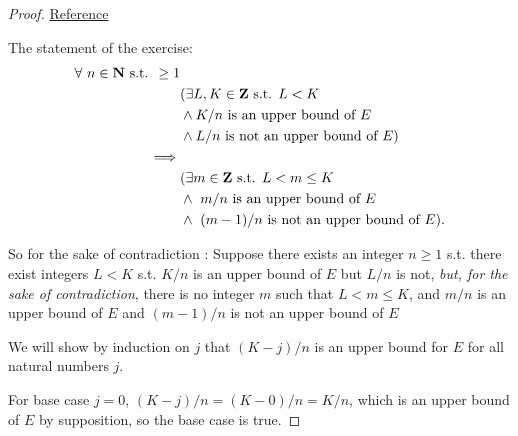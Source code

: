\begin{proof}
\href{https://taoanalysis.wordpress.com/2020/05/14/exercise-5-5-2/}{Reference}

The statement of the exercise:
\begin{align*}
    \forall\ n \in \mathbf{N} \text{ s.t. } \ge 1 & \\
             & (\exists L, K \in \mathbf{Z} \text{ s.t. } L < K \\
             &  \land K/n \text{ is an upper bound of } E \\
             &  \land L/n \text{ is not an upper bound of } E) \\
    \implies & \\
             & (\exists m \in \mathbf{Z} \text{ s.t. } L < m \le K \\
             &  \land\ m/n \text{ is an upper bound of } E \\
             &  \land\ (m - 1)/n \text{ is not an upper bound of } E).
\end{align*}

So for the sake of contradiction : Suppose there exists an integer \(n \ge 1\) s.t. there exist integers \(L < K\) s.t. \(K/n\) is an upper bound of \(E\) but \(L/n\) is not, \emph{but, for the sake of contradiction}, there is no integer \(m\) such that \(L < m \le K\), and \(m/n\) is an upper bound of \(E\) and \((m - 1)/n\) is not an upper bound of \(E\)

We will show by induction on \(j\) that  \((K - j)/n\) is an upper bound for \(E\) for all natural numbers \(j\).

For base case \(j = 0\), \((K - j)/n = (K - 0)/n = K/n\), which is an upper bound of \(E\) by supposition, so the base case is true.


\end{proof}

